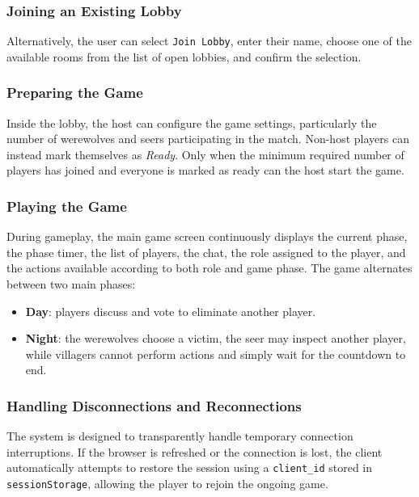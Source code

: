 \documentclass{scrartcl}
\begin{document}
\subsubsection{Joining an Existing Lobby}

Alternatively, the user can select \texttt{Join Lobby}, enter their name, choose one of the available rooms from the list of open lobbies, and confirm the selection.

\subsubsection{Preparing the Game}

Inside the lobby, the host can configure the game settings, particularly the number of werewolves and seers participating in the match. Non-host players can instead mark themselves as \emph{Ready}. Only when the minimum required number of players has joined and everyone is marked as ready can the host start the game.

\subsubsection{Playing the Game}

During gameplay, the main game screen continuously displays the current phase, the phase timer, the list of players, the chat, the role assigned to the player, and the actions available according to both role and game phase. The game alternates between two main phases:

\begin{itemize}
    \item \textbf{Day}: players discuss and vote to eliminate another player.
    \item \textbf{Night}: the werewolves choose a victim, the seer may inspect another player, while villagers cannot perform actions and simply wait for the countdown to end.
\end{itemize}

\subsubsection{Handling Disconnections and Reconnections}

The system is designed to transparently handle temporary connection interruptions. If the browser is refreshed or the connection is lost, the client automatically attempts to restore the session using a \texttt{client\_id} stored in \texttt{sessionStorage}, allowing the player to rejoin the ongoing game.
\end{document}
